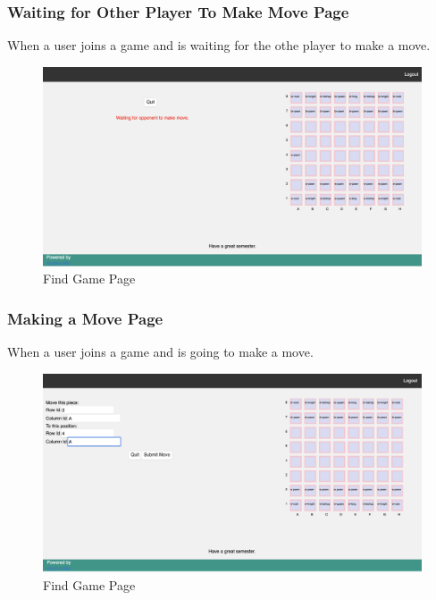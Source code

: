 \documentclass[12pt]{article}
\begin{document}
\subsubsection{Waiting for Other Player To Make Move Page}
When a user joins a game and is waiting for the othe player to make a move.
\begin{figure}[h!]
    \includegraphics[width=\linewidth]{PLAYER_WAITING_FOR_OTHER_TO_MAKE_MOVE_AFTER_MAKIN_MOVE.png}
    \caption{Find Game Page}
\end{figure}

\subsubsection{Making a Move Page}
When a user joins a game and is going to make a move.
\begin{figure}[h!]
    \includegraphics[width=\linewidth]{MAKING_MOVE.png}
    \caption{Find Game Page}
\end{figure}
\end{document}
